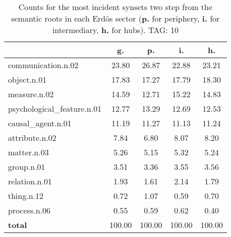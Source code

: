 \begin{table}[h!]
\begin{center}
\begin{tabular}{| l || c | c | c | c |}\hline
 & {\bf g.} & {\bf p.} & {\bf i.} & {\bf h.} \\\hline\hline
communication.n.02 & 23.80  & 26.87  & 22.88  & 23.21 \\\hline
object.n.01 & 17.83  & 17.27  & 17.79  & 18.30 \\\hline
measure.n.02 & 14.59  & 12.71  & 15.22  & 14.83 \\\hline
psychological\_feature.n.01 & 12.77  & 13.29  & 12.69  & 12.53 \\\hline
causal\_agent.n.01 & 11.19  & 11.27  & 11.13  & 11.24 \\\hline
attribute.n.02 & 7.84  & 6.80  & 8.07  & 8.20 \\\hline
matter.n.03 & 5.26  & 5.15  & 5.32  & 5.24 \\\hline
group.n.01 & 3.51  & 3.36  & 3.55  & 3.56 \\\hline
relation.n.01 & 1.93  & 1.61  & 2.14  & 1.79 \\\hline
thing.n.12 & 0.72  & 1.07  & 0.59  & 0.70 \\\hline
process.n.06 & 0.55  & 0.59  & 0.62  & 0.40 \\\hline\hline
{{\bf total}} & 100.00  & 100.00  & 100.00  & 100.00 \\\hline
\end{tabular}
\caption{Counts for the most incident synsets two step from the semantic roots in each Erd\"os sector ({\bf p.} for periphery, {\bf i.} for intermediary, {\bf h.} for hubs). TAG: 10}
\end{center}
\end{table}